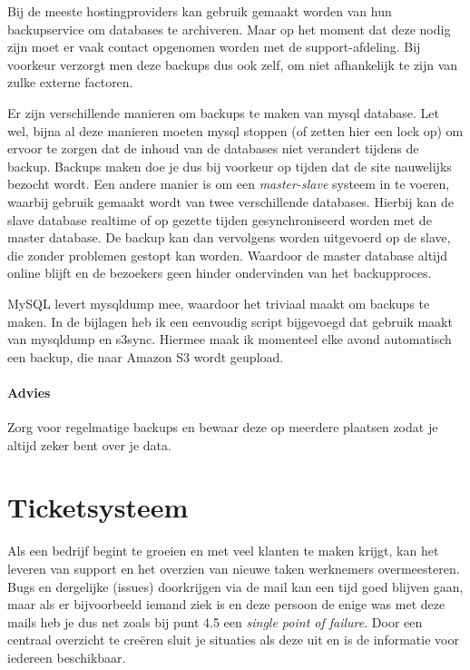 Bij de meeste hostingproviders kan gebruik gemaakt worden van hun backupservice om databases te archiveren. Maar op het moment dat deze nodig zijn moet er vaak contact opgenomen worden met de support-afdeling. Bij voorkeur verzorgt men deze backups dus ook zelf, om niet afhankelijk te zijn van zulke externe factoren.

Er zijn verschillende manieren om backups te maken van {\sc mysql} database. Let wel, bijna al deze manieren moeten {\sc mysql} stoppen (of zetten hier een lock op) om ervoor te zorgen dat de inhoud van de databases niet verandert tijdens de backup. Backups maken doe je dus bij voorkeur op tijden dat de site nauwelijks bezocht wordt. Een andere manier is om een \emph{master-slave} systeem in te voeren, waarbij gebruik gemaakt wordt van twee verschillende databases. Hierbij kan de slave database realtime of op gezette tijden gesynchroniseerd worden met de master database. De backup kan dan vervolgens worden uitgevoerd op de slave, die zonder problemen gestopt kan worden. Waardoor de master database altijd online blijft en de bezoekers geen hinder ondervinden van het backupproces.

{\sc MySQL} levert mysqldump mee, waardoor het triviaal maakt om backups te maken. In de bijlagen heb ik een eenvoudig script bijgevoegd dat gebruik maakt van mysqldump en s3sync. Hiermee maak ik momenteel elke avond automatisch een backup, die naar Amazon S3 wordt geupload.

\paragraph{Advies} Zorg voor regelmatige backups en bewaar deze op meerdere plaatsen zodat je altijd zeker bent over je data.

\section{Ticketsysteem}

Als een bedrijf begint te groeien en met veel klanten te maken krijgt, kan het leveren van support en het overzien van nieuwe taken werknemers overmeesteren. Bugs en dergelijke (issues) doorkrijgen via de mail kan een tijd goed blijven gaan, maar als er bijvoorbeeld iemand ziek is en deze persoon de enige was met deze mails heb je dus net zoals bij punt 4.5 een \emph{single point of failure}. Door een centraal overzicht te creëren sluit je situaties als deze uit en is de informatie voor iedereen beschikbaar.

